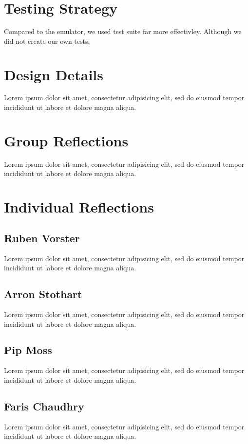 \documentclass[11pt]{article}
\begin{document}
\section{Testing Strategy}
Compared to the emulator, we used test suite far more effectivley. Although we did not create our own tests, 

\section{Design Details}
Lorem ipsum dolor sit amet, consectetur adipisicing elit, sed do eiusmod tempor
incididunt ut labore et dolore magna aliqua. 

\section{Group Reflections}
Lorem ipsum dolor sit amet, consectetur adipisicing elit, sed do eiusmod tempor
incididunt ut labore et dolore magna aliqua. 

\section{Individual Reflections}
\subsection{Ruben Vorster}
Lorem ipsum dolor sit amet, consectetur adipisicing elit, sed do eiusmod tempor
incididunt ut labore et dolore magna aliqua.
\subsection{Arron Stothart}
Lorem ipsum dolor sit amet, consectetur adipisicing elit, sed do eiusmod tempor
incididunt ut labore et dolore magna aliqua.
\subsection{Pip Moss}
Lorem ipsum dolor sit amet, consectetur adipisicing elit, sed do eiusmod tempor
incididunt ut labore et dolore magna aliqua.
\subsection{Faris Chaudhry}
Lorem ipsum dolor sit amet, consectetur adipisicing elit, sed do eiusmod tempor
incididunt ut labore et dolore magna aliqua.
\end{document}
